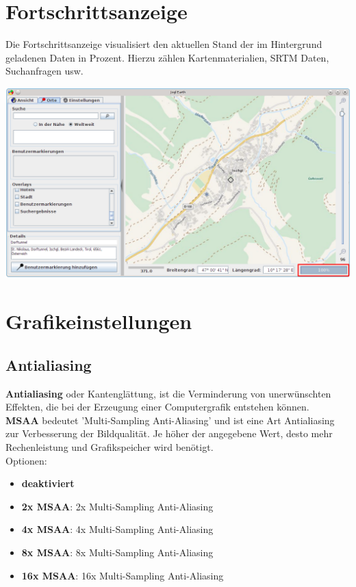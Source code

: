 \documentclass[10pt]{scrreprt}
\begin{document}
\section{Fortschrittsanzeige} 
Die Fortschrittsanzeige visualisiert den aktuellen Stand der im Hintergrund geladenen Daten in Prozent. Hierzu zählen Kartenmaterialien, SRTM Daten, Suchanfragen usw.

\vspace{3mm}
\begin{center}
\includegraphics[scale=0.375]{images/fortschrittsanzeige.png}
\end{center}


\newpage
\section{Grafikeinstellungen} 

\vspace{3mm}
\subsection{Antialiasing}    

\textbf{Antialiasing} oder Kantenglättung, ist die Verminderung von unerwünschten Effekten, die bei der Erzeugung einer Computergrafik entstehen können.\\

\textbf{MSAA} bedeutet 'Multi-Sampling Anti-Aliasing' und ist eine Art Antialiasing zur Verbesserung der Bildqualität. Je höher der angegebene Wert, desto mehr Rechenleistung und Grafikspeicher wird benötigt.\\

Optionen:
\begin{itemize}
\item \textbf{deaktiviert}
\item \textbf{2x MSAA}: 2x Multi-Sampling Anti-Aliasing
\item \textbf{4x MSAA}: 4x Multi-Sampling Anti-Aliasing
\item \textbf{8x MSAA}: 8x Multi-Sampling Anti-Aliasing
\item \textbf{16x MSAA}: 16x Multi-Sampling Anti-Aliasing
\end{itemize}
\end{document}
